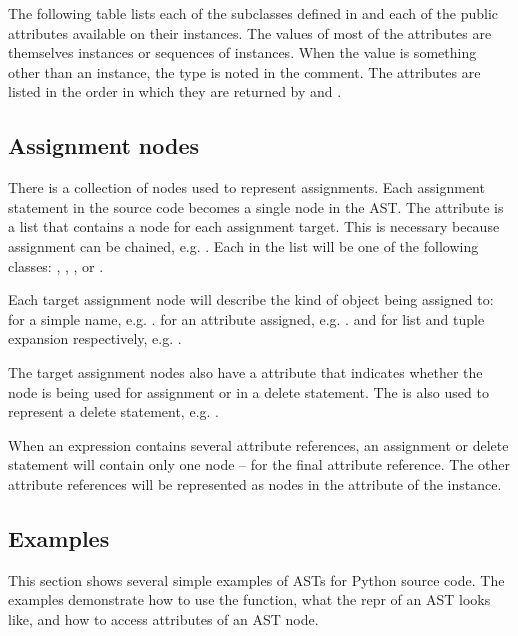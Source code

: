 The following table lists each of the  subclasses defined
in  and each of the public attributes available
on their instances.  The values of most of the attributes are
themselves  instances or sequences of instances.  When the
value is something other than an instance, the type is noted in the
comment.  The attributes are listed in the order in which they are
returned by  and .




\subsection{Assignment nodes}

There is a collection of nodes used to represent assignments.  Each
assignment statement in the source code becomes a single
 node in the AST.  The  attribute is a
list that contains a node for each assignment target.  This is
necessary because assignment can be chained, e.g. .
Each  in the list will be one of the following classes: 
, , , or
. 

Each target assignment node will describe the kind of object being
assigned to:   for a simple name, e.g. .
 for an attribute assigned, e.g. .
 and  for list and tuple expansion
respectively, e.g. .

The target assignment nodes also have a  attribute that
indicates whether the node is being used for assignment or in a delete
statement.  The  is also used to represent a delete
statement, e.g. .

When an expression contains several attribute references, an
assignment or delete statement will contain only one 
node -- for the final attribute reference.  The other attribute
references will be represented as  nodes in the
 attribute of the  instance.

\subsection{Examples}

This section shows several simple examples of ASTs for Python source
code.  The examples demonstrate how to use the 
function, what the repr of an AST looks like, and how to access
attributes of an AST node.


